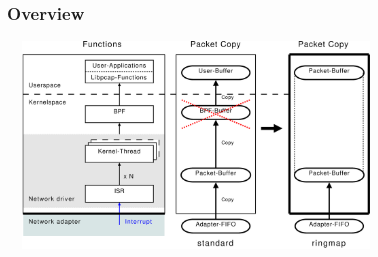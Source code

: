 \begin{frame}
\frametitle{Overview}
\begin{center}
\includegraphics [height=55mm,width=100mm]{pics/Ueberblick_new_summit}
\end{center}
\end{frame}

